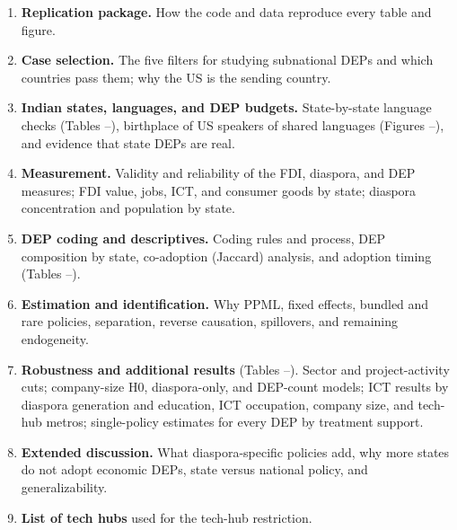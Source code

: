 \documentclass[12pt]{article}
\begin{document}
\begin{enumerate}[label=\arabic*., leftmargin=*, itemsep=4pt]
    \item \textbf{Replication package.} How the code and data reproduce every table and figure.
    \item \textbf{Case selection.} The five filters for studying subnational DEPs and which countries pass them; why the US is the sending country.
    \item \textbf{Indian states, languages, and DEP budgets.} State-by-state language checks (Tables --), birthplace of US speakers of shared languages (Figures --), and evidence that state DEPs are real.
    \item \textbf{Measurement.} Validity and reliability of the FDI, diaspora, and DEP measures; FDI value, jobs, ICT, and consumer goods by state; diaspora concentration and population by state.
    \item \textbf{DEP coding and descriptives.} Coding rules and process, DEP composition by state, co-adoption (Jaccard) analysis, and adoption timing (Tables --).
    \item \textbf{Estimation and identification.} Why PPML, fixed effects, bundled and rare policies, separation, reverse causation, spillovers, and remaining endogeneity.
    \item \textbf{Robustness and additional results} (Tables --). Sector and project-activity cuts; company-size H0, diaspora-only, and DEP-count models; ICT results by diaspora generation and education, ICT occupation, company size, and tech-hub metros; single-policy estimates for every DEP by treatment support.
    \item \textbf{Extended discussion.} What diaspora-specific policies add, why more states do not adopt economic DEPs, state versus national policy, and generalizability.
    \item \textbf{List of tech hubs} used for the tech-hub restriction.
\end{enumerate}
\end{document}
